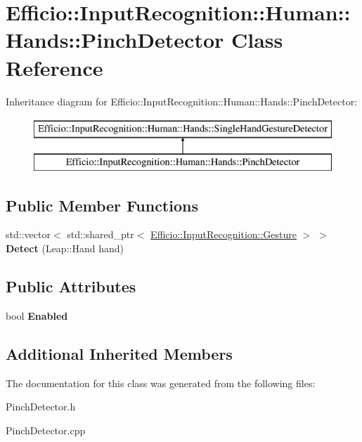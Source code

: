 \hypertarget{class_efficio_1_1_input_recognition_1_1_human_1_1_hands_1_1_pinch_detector}{}\section{Efficio\+:\+:Input\+Recognition\+:\+:Human\+:\+:Hands\+:\+:Pinch\+Detector Class Reference}
\label{class_efficio_1_1_input_recognition_1_1_human_1_1_hands_1_1_pinch_detector}
Inheritance diagram for Efficio\+:\+:Input\+Recognition\+:\+:Human\+:\+:Hands\+:\+:Pinch\+Detector\+:\begin{figure}[H]
\begin{center}
\leavevmode
\includegraphics[height=2.000000cm]{class_efficio_1_1_input_recognition_1_1_human_1_1_hands_1_1_pinch_detector}
\end{center}
\end{figure}
\subsection*{Public Member Functions}
\begin{DoxyCompactItemize}
\item 
std\+::vector$<$ std\+::shared\+\_\+ptr$<$ \hyperlink{class_efficio_1_1_input_recognition_1_1_gesture}{Efficio\+::\+Input\+Recognition\+::\+Gesture} $>$ $>$ {\bfseries Detect} (Leap\+::\+Hand hand)\hypertarget{class_efficio_1_1_input_recognition_1_1_human_1_1_hands_1_1_pinch_detector_a2488f7f3594f68d745da77364d025eef}{}\label{class_efficio_1_1_input_recognition_1_1_human_1_1_hands_1_1_pinch_detector_a2488f7f3594f68d745da77364d025eef}

\end{DoxyCompactItemize}
\subsection*{Public Attributes}
\begin{DoxyCompactItemize}
\item 
bool {\bfseries Enabled}\hypertarget{class_efficio_1_1_input_recognition_1_1_human_1_1_hands_1_1_pinch_detector_ace7cbaf0cc98103be15dfdc621a49f3f}{}\label{class_efficio_1_1_input_recognition_1_1_human_1_1_hands_1_1_pinch_detector_ace7cbaf0cc98103be15dfdc621a49f3f}

\end{DoxyCompactItemize}
\subsection*{Additional Inherited Members}


The documentation for this class was generated from the following files\+:\begin{DoxyCompactItemize}
\item 
Pinch\+Detector.\+h\item 
Pinch\+Detector.\+cpp\end{DoxyCompactItemize}
